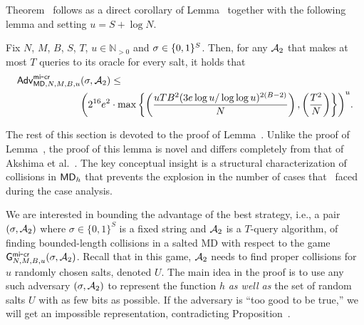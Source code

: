 Theorem~ follows as a direct corollary of Lemma~ together with the following lemma and setting $u=S+\log N$.

\begin{lemma} \label{lem:comp}
  Fix $N$, $M$, $B$, $S$, $T$, $u\in \mathbb{N}_{>0}$ and $\sigma\in \{0,1\}^S$. Then, for any $\mathcal{A}_2$ that makes at most $T$ queries to its oracle for every salt, it holds that 
  \begin{align*}
  \mathsf{Adv}_{\mathsf{MD},N,M,B,u}^{{\mathsf{mi}\mbox{-}\mathsf{cr}}}&(\sigma, \mathcal{A}_2) \leq \\ & {\left({2^{16}} e^2\cdot \max\left\{\left(\frac{uTB^2(3e\log u/\log \log u)^{2({B-2})}}{N}\right),\left(\frac{T^2}{N}\right)\right\}\right)}^u . 
    \end{align*}
\end{lemma}

The rest of this section is devoted to the proof of Lemma~. Unlike the proof of Lemma~, the proof of this lemma is novel and differs completely from that of Akshima et al.~\cite{AkshimaCDW20}. The key conceptual insight is a structural characterization of collisions in $\mathsf{MD}_h$ that prevents the explosion in the number of cases that~\cite{AkshimaCDW20} faced during the case analysis.



%
We are interested in bounding the advantage of the best strategy, i.e., a pair  $(\sigma,\mathcal{A}_2)$ where $\sigma\in \{0,1\}^S$ is a fixed string and $\mathcal{A}_2$ is a $T$-query algorithm, of finding bounded-length collisions in a salted MD with respect to the game $\mathsf{G}^{\mathsf{mi}\mbox{-}\mathsf{cr}}_{N,M,B,u}(\sigma, \mathcal{A}_2)$.  Recall that in this game, $\mathcal{A}_2$ needs to find proper collisions for $u$ randomly chosen salts, denoted $U$. The main idea in the proof is to use any such adversary  $(\sigma,\mathcal{A}_2)$ to represent the function $h$ \emph{as well as} the set of random salts $U$ with as few bits as possible.  If the adversary is ``too good to be true,'' we will get an impossible representation, contradicting Proposition~.

